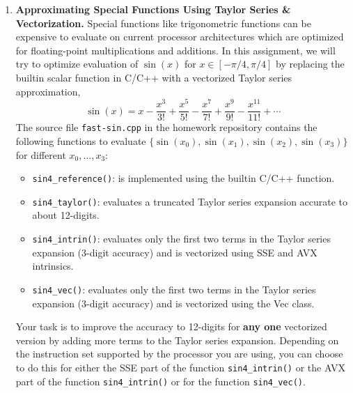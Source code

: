 \documentclass[12pt]{article}
\begin{document}
\begin{enumerate}
  \item {\bf Approximating Special Functions Using Taylor Series \& Vectorization.}
    Special functions like trigonometric functions can be expensive to
    evaluate on current processor architectures which are optimized for
    floating-point multiplications and additions. In this assignment, we
    will try to optimize evaluation of $\sin(x)$ for $x\in[-\pi/4,
    \pi/4]$ by replacing the builtin scalar function in C/C++ with a
    vectorized Taylor series approximation,
    \[
      \sin(x) = x - \frac{x^3}{3!} + \frac{x^5}{5!} - \frac{x^7}{7!} + \frac{x^9}{9!} - \frac{x^{11}}{11!} + \cdots
    \]
    The source file \texttt{fast-sin.cpp} in the homework repository
    contains the following functions to evaluate $\{\sin(x_0),
    \sin(x_1), \sin(x_2), \sin(x_3)\}$ for different $x_0,\ldots,x_3$:
    \begin{itemize}
      \item \texttt{sin4\_reference()}: is implemented using the builtin C/C++ function.
      \item \texttt{sin4\_taylor()}: evaluates a truncated Taylor series expansion accurate to about 12-digits.
      \item \texttt{sin4\_intrin()}: evaluates only the first two
        terms in the Taylor series expansion (3-digit accuracy) and
        is vectorized using SSE and AVX intrinsics.
      \item \texttt{sin4\_vec()}: evaluates only the first two terms
        in the Taylor series expansion (3-digit accuracy) and
        is vectorized using the Vec class.
    \end{itemize}
    Your task is to improve the accuracy to 12-digits for {\bf any one}
    vectorized version by adding more terms to the Taylor series
    expansion.  Depending on the instruction set supported by the
    processor you are using, you can choose to do this for either the
    SSE part of the function \texttt{sin4\_intrin()} or the AVX part of
    the function \texttt{sin4\_intrin()} or for the function
    \texttt{sin4\_vec()}.


\end{enumerate}
\end{document}
